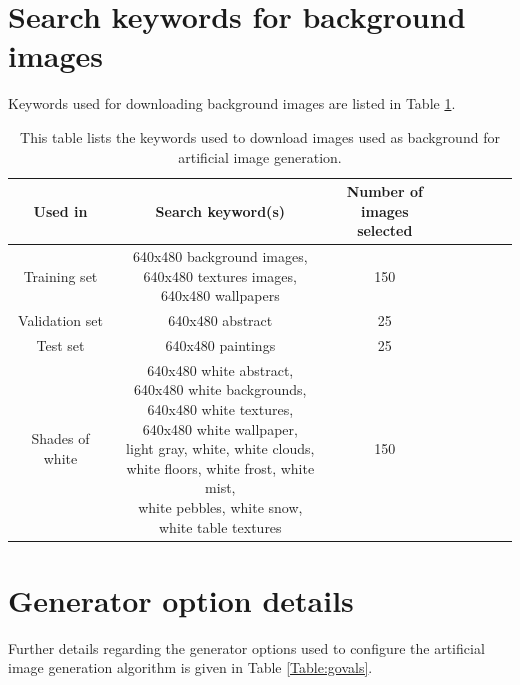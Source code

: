 \section{Search keywords for background images}

Keywords used for downloading background images are listed in Table \ref{Table:download}.

\begin{table}
	\centering
	\begin{tabular}{|c|c|c|c|c|c|c|c|}
	\hline 
    Used in & Search keyword(s) & \makecell{Number of \\images selected} \\ 
	\hline 
	Training set & \makecell{640x480 background images, \\640x480 textures images, \\640x480 wallpapers} & 150 \\ 
	\hline 
	Validation set & 640x480 abstract & 25 \\ 
	\hline 
	Test set & 640x480 paintings & 25 \\ 
	\hline 
	Shades of white & \makecell{640x480 white abstract, \\640x480 white backgrounds, \\640x480 white textures, \\640x480 white wallpaper, \\light gray, white, white clouds, \\white floors, white frost, white mist, \\white pebbles, white snow, \\white table textures} & 150 \\ 
	\hline 
	\end{tabular}
	\caption{This table lists the keywords used to download images used as background for artificial image generation.} 
	\label{Table:download}
\end{table}

\section{Generator option details}

Further details regarding the generator options used to configure the artificial image generation algorithm is given in Table \ref{Table:govals}.

